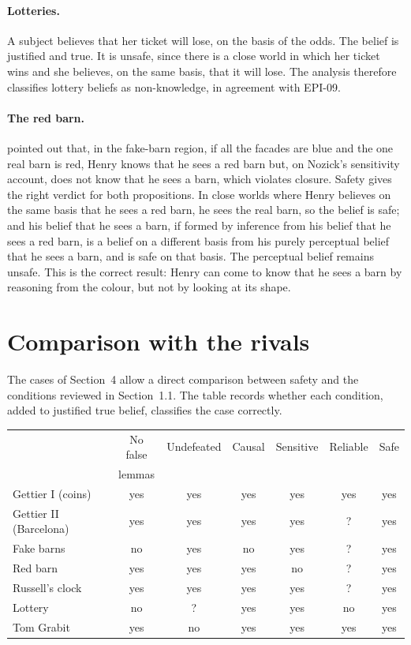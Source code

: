 \documentclass{situationist-preprint}
\begin{document}
\paragraph{Lotteries.} A subject believes that her ticket will lose, on the basis of the odds. The belief is justified and true. It is unsafe, since there is a close world in which her ticket wins and she believes, on the same basis, that it will lose. The analysis therefore classifies lottery beliefs as non-knowledge, in agreement with EPI-09.

\paragraph{The red barn.} \citet{Kripke2011} pointed out that, in the fake-barn region, if all the facades are blue and the one real barn is red, Henry knows that he sees a red barn but, on Nozick's sensitivity account, does not know that he sees a barn, which violates closure. Safety gives the right verdict for both propositions. In close worlds where Henry believes on the same basis that he sees a red barn, he sees the real barn, so the belief is safe; and his belief that he sees a barn, if formed by inference from his belief that he sees a red barn, is a belief on a different basis from his purely perceptual belief that he sees a barn, and is safe on that basis. The perceptual belief remains unsafe. This is the correct result: Henry can come to know that he sees a barn by reasoning from the colour, but not by looking at its shape.

\section{Comparison with the rivals}

The cases of Section~4 allow a direct comparison between safety and the conditions reviewed in Section~1.1. The table records whether each condition, added to justified true belief, classifies the case correctly.

\begin{center}\small
\begin{tabular}{@{}lcccccc@{}}
\toprule
 & No false & Undefeated & Causal & Sensitive & Reliable & Safe \\
 & lemmas & & & & & \\
\midrule
Gettier I (coins) & yes & yes & yes & yes & yes & yes \\
Gettier II (Barcelona) & yes & yes & yes & yes & ? & yes \\
Fake barns & no & yes & no & yes & ? & yes \\
Red barn & yes & yes & yes & no & ? & yes \\
Russell's clock & yes & yes & yes & yes & ? & yes \\
Lottery & no & ? & yes & yes & no & yes \\
Tom Grabit & yes & no & yes & yes & yes & yes \\
\bottomrule
\end{tabular}
\end{center}
\end{document}
